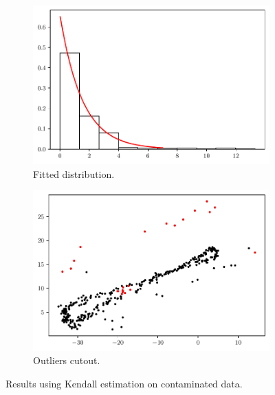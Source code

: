 \documentclass[11pt]{article}
\theoremstyle{definition}
\theoremstyle{remark}
\theoremstyle{remark}
\begin{document}
\begin{figure}[H]
  \centering
  \begin{subfigure}[t]{0.475\textwidth}
    \centering
    \includegraphics[scale=0.45]{../figs/kendall_hist_with-noise.pdf}
    \caption{Fitted distribution.}
  \end{subfigure}
  \begin{subfigure}[t]{0.475\textwidth}
    \centering
    \includegraphics[scale=0.45]{../figs/kendall_scatter_with-noise.pdf}
    \caption{Outliers cutout.}
  \end{subfigure}
  \caption{Results using Kendall estimation on contaminated data.}
  \label{fig:kendall_cut_wnoise}
\end{figure}
\end{document}
